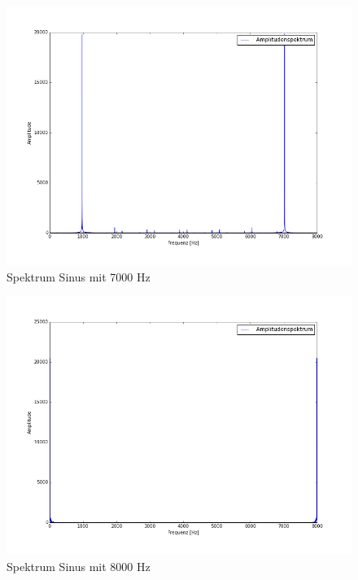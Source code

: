 \documentclass[12pt,oneside,a4paper]{report}
\begin{document}
\begin{figure}[H]
\centering\small
\includegraphics[scale=0.4]{src/7000fft.png}
\caption{Spektrum Sinus mit 7000 Hz}
\label{fig:7000_FFT}
\end{figure}

\begin{figure}[H]
\centering\small
\includegraphics[scale=0.4]{src/8000fft.png}
\caption{Spektrum Sinus mit 8000 Hz}
\label{fig:8000_FFT}
\end{figure}
\end{document}
